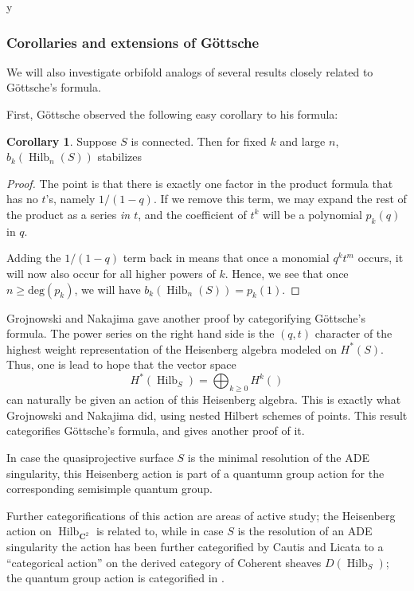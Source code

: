 y\documentclass{amsart}[12pt]
\theoremstyle{definition}
\newtheorem{corollary}[dummy]{Corollary}
\newcommand{\C}{\mathbf{C}}
\DeclareMathOperator{\Hilb}{Hilb}
\newcommand{\HG}{\Hilb}
\begin{document}
\subsubsection{Corollaries and extensions of G\"ottsche}
We will also investigate orbifold analogs of several results closely related to G\"ottsche's formula.

First, G\"ottsche observed the following easy corollary to his formula:
\begin{corollary}  Suppose $S$ is connected.
Then for fixed $k$ and large $n$, $b_{k}(\Hilb_n(S))$ stabilizes
\end{corollary}

\begin{proof}
The point is that there is exactly one factor in the product formula that has no $t$'s, namely $1/(1-q)$.  If we remove this term, we may expand the rest of the product as a series \emph{in $t$}, and the coefficient of $t^k$ will be a polynomial $p_k(q)$ in $q$.  

Adding the $1/(1-q)$ term back in means that once a monomial $q^kt^m$ occurs, it will now also occur for all higher powers of $k$.  Hence, we see that once $n\geq\text{deg}(p_k)$, we will have $b_k(\Hilb_n(S))=p_k(1)$.
\end{proof}

Grojnowski and Nakajima \cite{grojnowski, nakajimaheisenberg} gave another proof by categorifying G\"ottsche's formula.  The power series on the right hand side is the $(q,t)$ character of the highest weight representation of the Heisenberg algebra modeled on $H^*(S)$.  Thus, one is lead to hope that the vector space 
$$H^*(\HG_S)=\bigoplus_{k\geq 0} H^k()$$
can naturally be given an action of this Heisenberg algebra.  This is exactly what Grojnowski and Nakajima did, using nested Hilbert schemes of points.  This result categorifies G\"ottsche's formula, and gives another proof of it.

In case the quasiprojective surface $S$ is the minimal resolution of the ADE singularity, this Heisenberg action is part of a quantumn group action for the corresponding semisimple quantum group.

Further categorifications of this action are areas of active study; the Heisenberg action on $\HG_{\C^2}$ is related to, while in case $S$ is the resolution of an ADE singularity the action has been further categorified by Cautis and Licata \cite{CL} to a ``categorical action'' on the derived category of Coherent sheaves $D(\Hilb_S)$; the quantum group action is categorified in \cite{CL2}.
\end{document}
